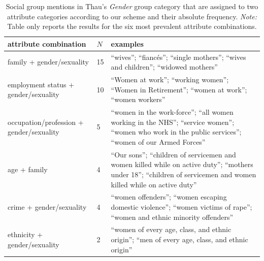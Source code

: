 \begin{table}[!th]
\centering
\caption{Social group mentions in Thau's \emph{Gender} group category that are assigned to two attribute categories according to our scheme and their absolute frequency. \emph{Note:} Table only reports the results for the six most prevalent attribute combinations.}
\label{tableC09}
\begin{tabular}{p{2.2in} l L{3in}}
\toprule
attribute combination & $N$ & examples \\
\midrule
family + gender/sexuality & 15 & ``wives''; ``fiancés''; ``single mothers''; ``wives and children''; ``widowed mothers'' \\
employment status + gender/sexuality & 10 & ``Women at work''; ``working women''; ``Women in Retirement''; ``women at work''; ``women workers'' \\
occupation/profession + gender/sexuality & 5 & ``women in the work-force''; ``all women working in the NHS''; ``service women''; ``women who work in the public services''; ``women of our Armed Forces'' \\
age + family & 4 & ``Our sons''; ``children of servicemen and women killed while on active duty''; ``mothers under 18''; ``children of servicemen and women killed while on active duty'' \\
crime + gender/sexuality & 4 & ``women offenders''; ``women escaping domestic violence''; ``women victims of rape''; ``women and ethnic minority offenders'' \\
ethnicity + gender/sexuality & 2 & ``women of every age, class, and ethnic origin''; ``men of every age, class, and ethnic origin'' \\
\bottomrule
\end{tabular}
\end{table}
